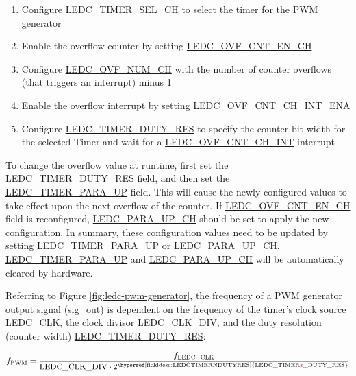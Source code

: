 \documentclass[main\_\_EN.tex]{subfiles}
\begin{document}
 \begin{enumerate}
    \item Configure \hyperref[fielddesc:LEDCTIMERSELCHN]{LEDC\_TIMER\_SEL\_CH} to select the timer for the PWM generator
    \item Enable the overflow counter by setting \hyperref[fielddesc:LEDCOVFCNTENCHN]{LEDC\_OVF\_CNT\_EN\_CH}
    \item Configure \hyperref[fielddesc:LEDCOVFNUMCHN]{LEDC\_OVF\_NUM\_CH} with the number of counter overflows (that triggers an interrupt) minus 1
    \item Enable the overflow interrupt by setting \hyperref[fielddesc:LEDCOVFCNTCHNINTENA]{LEDC\_OVF\_CNT\_CH\_INT\_ENA}
    \item Configure \hyperref[fielddesc:LEDCTIMERNDUTYRES]{LEDC\_TIMER\_DUTY\_RES} to specify the counter bit width for the selected Timer and wait for a \hyperref[int:ledc-ovf-cnt]{LEDC\_OVF\_CNT\_CH\_INT} interrupt
\end{enumerate}

To change the overflow value at runtime, first set the \hyperref[fielddesc:LEDCTIMERNDUTYRES]{LEDC\_TIMER\_DUTY\_RES} field, and then set the\\ \hyperref[fielddesc:LEDCTIMERNPARAUP]{LEDC\_TIMER\_PARA\_UP} field. This will cause the newly configured values to take effect upon the next overflow of the counter. If \hyperref[fielddesc:LEDCOVFCNTENCHN]{LEDC\_OVF\_CNT\_EN\_CH} field is reconfigured, \hyperref[fielddesc:LEDCPARAUPCHN]{LEDC\_PARA\_UP\_CH} should be set to apply the new configuration. In summary, these configuration values need to be updated by setting \hyperref[fielddesc:LEDCTIMERNPARAUP]{LEDC\_TIMER\_PARA\_UP} or \hyperref[fielddesc:LEDCPARAUPCHN]{LEDC\_PARA\_UP\_CH}. \hyperref[fielddesc:LEDCTIMERNPARAUP]{LEDC\_TIMER\_PARA\_UP} and \hyperref[fielddesc:LEDCPARAUPCHN]{LEDC\_PARA\_UP\_CH} will be automatically cleared by hardware.

Referring to Figure \ref{fig:ledc-pwm-generator}, the frequency of a PWM generator output signal (sig\_out) is dependent on the frequency of the timer’s clock source LEDC\_CLK, the clock divisor LEDC\_CLK\_DIV, and the duty resolution (counter width) \hyperref[fielddesc:LEDCTIMERNDUTYRES]{LEDC\_TIMER\_DUTY\_RES}:

\begin{equation}
    f_{\textrm{PWM}}=\frac{f_{\textrm{LEDC\_CLK}}}
                        {\textrm{LEDC\_CLK\_DIV}\cdot 2^{\textrm{\hyperref[fielddesc:LEDCTIMERNDUTYRES]{LEDC\_TIMER\regindex{x}\_DUTY\_RES}}}}
\end{equation}
\end{document}
